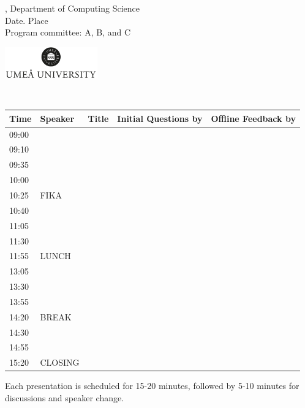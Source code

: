 
\begin{landscape}
\footnotesize

\noindent\begin{minipage}{16.5cm}\small
{}, Department of Computing Science\\
\noindent Date.  Place\\
\noindent Program committee: A, B, and C
\end{minipage}
\begin{minipage}{4.1cm}
\includegraphics[width=4cm]{logo.png}
\end{minipage}\\

\vspace{.5cm}


\begin{center}
\begin{tabular}{|l|p{3.5cm}|p{7.5cm}|p{3.5cm}|p{3.5cm}|} \hline
\rowcolor[gray]{.7}
Time    &       Speaker&    Title&      Initial Questions by&   Offline Feedback by \\ \hline
\rowcolor[gray]{.8} 
09:00&&&& \\ \hline
09:10&&&& \\ \hline
09:35&&&& \\ \hline
10:00&&&& \\ \hline
\rowcolor[gray]{.8}
10:25&FIKA&&& \\ \hline
10:40&&&& \\ \hline
11:05&&&& \\ \hline
11:30&&&& \\ \hline
\rowcolor[gray]{.8}
11:55&LUNCH&&& \\ \hline
13:05&&&& \\ \hline
13:30&&&& \\ \hline
13:55&&&& \\ \hline
\rowcolor[gray]{.8}
14:20&BREAK&&& \\ \hline
14:30&&&& \\ \hline
14:55&&&& \\ \hline
\rowcolor[gray]{.8}
15:20&CLOSING&&& \\ \hline
\end{tabular}
\end{center}
\noindent Each presentation is scheduled for 15-20 minutes, followed by 5-10 minutes for discussions and speaker change.
\end{landscape}
